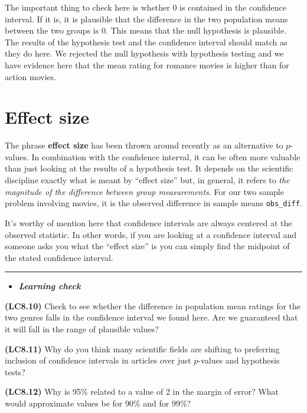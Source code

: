 \documentclass[]{tufte-book}
\let\oldrule=\rule
\renewcommand{\rule}[1]{\oldrule{\linewidth}}
\newenvironment{rmdblock}[1]
  {\begin{shaded*}
  \begin{itemize}
  \renewcommand{\labelitemi}{
    \raisebox{-.7\height}[0pt][0pt]{
    }
  }
  \item
  }
  {
  \end{itemize}
  \end{shaded*}
  }
\newenvironment{learncheck}
  {\begin{rmdblock}{warning}}
  {\end{rmdblock}}
\begin{document}
The important thing to check here is whether 0 is contained in the
confidence interval. If it is, it is plausible that the difference in
the two population means between the two groups is 0. This means that
the null hypothesis is plausible. The results of the hypothesis test and
the confidence interval should match as they do here. We rejected the
null hypothesis with hypothesis testing and we have evidence here that
the mean rating for romance movies is higher than for action movies.

\section{Effect size}\label{effect-size}

The phrase \textbf{effect size} has been thrown around recently as an
alternative to \(p\)-values. In combination with the confidence
interval, it can be often more valuable than just looking at the results
of a hypothesis test. It depends on the scientific discipline exactly
what is meant by ``effect size'' but, in general, it refers to \emph{the
magnitude of the difference between group measurements}. For our two
sample problem involving movies, it is the observed difference in sample
means \texttt{obs\_diff}.

It's worthy of mention here that confidence intervals are always
centered at the observed statistic. In other words, if you are looking
at a confidence interval and someone asks you what the ``effect size''
is you can simply find the midpoint of the stated confidence interval.

\begin{center}\rule{0.5\linewidth}{\linethickness}\end{center}

\begin{learncheck}
\textbf{\emph{Learning check}}
\end{learncheck}

\textbf{(LC8.10)} Check to see whether the difference in population mean
ratings for the two genres falls in the confidence interval we found
here. Are we guaranteed that it will fall in the range of plausible
values?

\textbf{(LC8.11)} Why do you think many scientific fields are shifting
to preferring inclusion of confidence intervals in articles over just
\(p\)-values and hypothesis tests?

\textbf{(LC8.12)} Why is 95\% related to a value of 2 in the margin of
error? What would approximate values be for 90\% and for 99\%?
\end{document}
